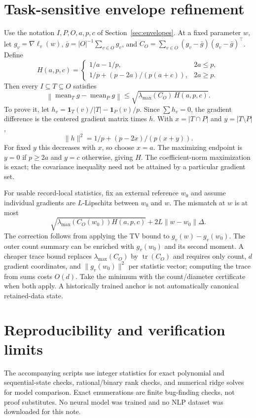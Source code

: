 \documentclass[11pt,a4paper]{article}
\theoremstyle{definition}\newtheorem{definition}[theorem]{Definition}
\newcommand{\minus}{\setminus}
\begin{document}
\section{Task-sensitive envelope refinement}\label{app:envelope-moments}
Use the notation $I,P,O,a,p,c$ of Section~\ref{sec:envelopes}. At a fixed parameter $w$, let $g_v=\nabla\ell_v(w)$, $\bar g=|O|^{-1}\sum_{v\in O}g_v$, and $C_O=\sum_{v\in O}(g_v-\bar g)(g_v-\bar g)^\top$. Define
\[
 H(a,p,c)=
 \begin{cases}
 1/a-1/p,&2a\le p,\\
 1/p+(p-2a)/(p(a+c)),&2a\ge p.
 \end{cases}
\]
Then every $I\subseteq T\subseteq O$ satisfies
\[
 \left\|\operatorname{mean}_{T}g-\operatorname{mean}_{P}g\right\|
 \le\sqrt{\lambda_{\max}(C_O)\,H(a,p,c)}.
\]
To prove it, let $h_v=\mathbf1_T(v)/|T|-\mathbf1_P(v)/p$. Since $\sum h_v=0$, the gradient difference is the centered gradient matrix times $h$. With $x=|T\cap P|$ and $y=|T\minus P|$,
\[
 \|h\|^2=1/p+(p-2x)/(p(x+y)).
\]
For fixed $y$ this decreases with $x$, so choose $x=a$. The maximizing endpoint is $y=0$ if $p\ge2a$ and $y=c$ otherwise, giving $H$. The coefficient-norm maximization is exact; the covariance inequality need not be attained by a particular gradient set.

For usable record-local statistics, fix an external reference $w_0$ and assume individual gradients are $L$-Lipschitz between $w_0$ and $w$. The mismatch at $w$ is at most
\[
 \sqrt{\lambda_{\max}(C_O(w_0))H(a,p,c)}
 +2L\|w-w_0\|\Delta.
\]
The correction follows from applying the TV bound to $g_v(w)-g_v(w_0)$. The outer count summary can be enriched with $g_v(w_0)$ and its second moment. A cheaper trace bound replaces $\lambda_{\max}(C_O)$ by $\operatorname{tr}(C_O)$ and requires only count, $d$ gradient coordinates, and $\|g_v(w_0)\|^2$ per statistic vector; computing the trace from sums costs $O(d)$. Take the minimum with the count/diameter certificate when both apply. A historically trained anchor is not automatically canonical retained-data state.

\section{Reproducibility and verification limits}
The accompanying scripts use integer statistics for exact polynomial and sequential-state checks, rational/binary rank checks, and numerical ridge solves for model comparison. Exact enumerations are finite bug-finding checks, not proof substitutes. No neural model was trained and no NLP dataset was downloaded for this note.
\end{document}
